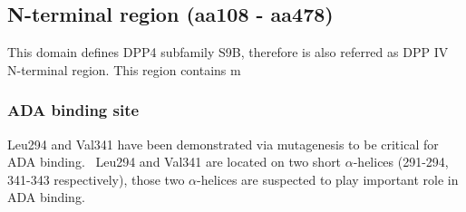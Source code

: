 \subsection{N-terminal region (aa108 - aa478)}

This domain defines DPP4 subfamily S9B, therefore is also referred as DPP IV N-terminal region. This region contains m

\subsubsection{ADA binding site}
Leu294 and Val341 have been demonstrated via mutagenesis to be critical for ADA binding.~\cite{Abbott_1999} Leu294 and Val341 are located on two short $\alpha$-helices (291-294, 341-343 respectively), those two $\alpha$-helices are suspected to play important role in ADA binding. 